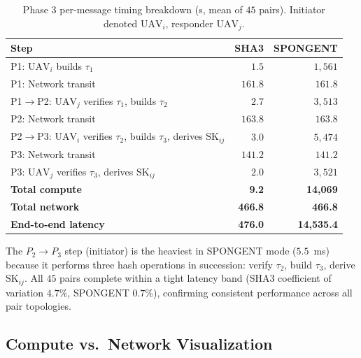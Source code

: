 \documentclass[conference,a4paper,10pt]{IEEEtran}
\begin{document}
\begin{table}[t]
\centering
\caption{Phase 3 per-message timing breakdown (\textmu s, mean of
$45$ pairs). Initiator denoted $\mathrm{UAV}_i$, responder
$\mathrm{UAV}_j$.}
\label{tab:phase3_break}
\begin{tabular}{@{}p{4.5cm}rr@{}}
\toprule
\textbf{Step} & \textbf{SHA3} & \textbf{SPONGENT} \\
\midrule
P1: $\mathrm{UAV}_i$ builds $\tau_1$         & $1.5$    & $1{,}561$ \\
P1: Network transit                          & $161.8$  & $161.8$ \\
P1$\to$P2: $\mathrm{UAV}_j$ verifies $\tau_1$, builds $\tau_2$
                                             & $2.7$    & $3{,}513$ \\
P2: Network transit                          & $163.8$  & $163.8$ \\
P2$\to$P3: $\mathrm{UAV}_i$ verifies $\tau_2$, builds $\tau_3$, derives $\mathrm{SK}_{ij}$
                                             & $3.0$    & $5{,}474$ \\
P3: Network transit                          & $141.2$  & $141.2$ \\
P3: $\mathrm{UAV}_j$ verifies $\tau_3$, derives $\mathrm{SK}_{ij}$
                                             & $2.0$    & $3{,}521$ \\
\midrule
\textbf{Total compute}                       & \textbf{9.2}   & \textbf{14{,}069} \\
\textbf{Total network}                       & \textbf{466.8} & \textbf{466.8} \\
\textbf{End-to-end latency}                  & \textbf{476.0} & \textbf{14{,}535.4} \\
\bottomrule
\end{tabular}
\end{table}

The $P_2{\to}P_3$ step (initiator) is the heaviest in SPONGENT mode
($5.5$~ms) because it performs three hash operations in succession:
verify $\tau_2$, build $\tau_3$, derive $\mathrm{SK}_{ij}$. All $45$
pairs complete within a tight latency band (SHA3 coefficient of
variation $4.7\%$, SPONGENT $0.7\%$), confirming consistent
performance across all pair topologies.

\subsection{Compute vs.\ Network Visualization}
\end{document}
